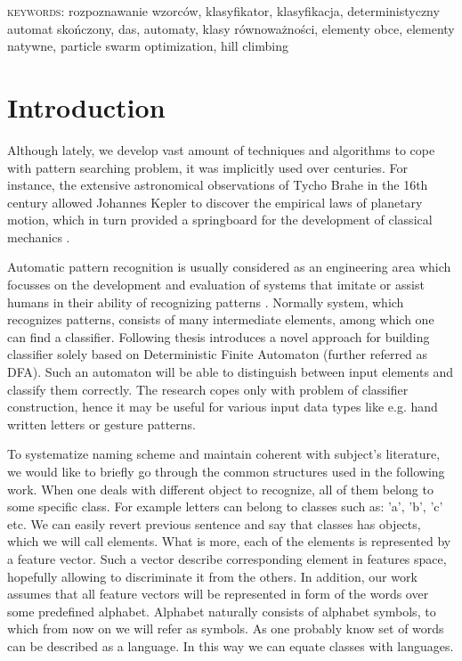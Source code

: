 \documentclass{mini}
\begin{document}
\bigskip
\textsc{keywords}: rozpoznawanie wzorców, klasyfikator, klasyfikacja, deterministyczny automat skończony, das, automaty, klasy równoważności, elementy obce, elementy natywne, particle swarm optimization, hill climbing

\chapter*{Introduction}
Although lately, we develop vast amount of techniques and algorithms to cope with pattern searching problem, it was implicitly used over centuries. For instance, the extensive astronomical observations of Tycho Brahe in the 16th century allowed Johannes Kepler to discover the empirical laws of
planetary motion, which in turn provided a springboard for the development of classical mechanics \cite{bishop_book}.

Automatic pattern recognition is usually considered as an engineering area which focusses on the development and evaluation of systems that imitate or assist humans in their ability of recognizing patterns \cite{duch_uuu}. Normally system, which recognizes patterns, consists of many intermediate elements, among which one can find a classifier. Following thesis introduces a novel approach for building classifier solely based on  Deterministic Finite Automaton (further referred as DFA). Such an automaton will be able to distinguish between input elements and classify them correctly. The research copes only with problem of classifier construction, hence it may be useful for various input data types like e.g. hand written letters or gesture patterns.

To systematize naming scheme and maintain coherent with subject's literature, we would like to briefly go through the common structures used in the following work. When one deals with different object to recognize, all of them belong to some specific class. For example letters can belong to classes such as: 'a', 'b', 'c' etc. We can easily revert previous sentence and say that classes has objects, which we will call elements. What is more, each of the elements is represented by a feature vector. Such a vector describe corresponding element in features space, hopefully allowing to discriminate it from the others. In addition, our work assumes that all feature vectors will be represented in form of the words over some predefined alphabet. Alphabet naturally consists of alphabet symbols, to which from now on we will refer as symbols. As one probably know set of words can be described as a language. In this way we can equate classes with languages.
\end{document}
